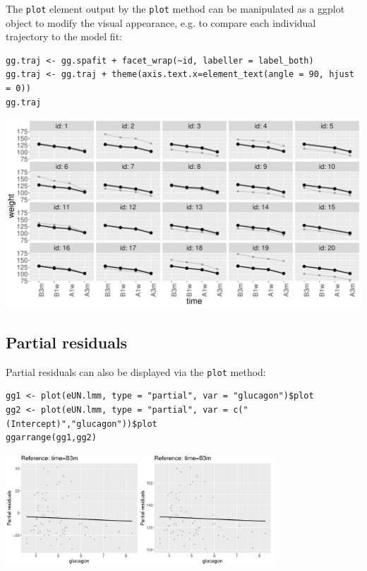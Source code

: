 \documentclass[12pt]{article}
\begin{document}
The \texttt{plot} element output by the \texttt{plot} method can be manipulated as a ggplot object
to modify the visual appearance, e.g. to compare each individual
trajectory to the model fit:
\lstset{language=r,label= ,caption= ,captionpos=b,numbers=none}
\begin{lstlisting}
gg.traj <- gg.spafit + facet_wrap(~id, labeller = label_both)
gg.traj <- gg.traj + theme(axis.text.x=element_text(angle = 90, hjust = 0))
gg.traj
\end{lstlisting}

\begin{center}
\includegraphics[width=\textwidth]{./figures/fit-autoplot-indiv.pdf}
\end{center}

\clearpage

\subsection{Partial residuals}
\label{sec:orge150da1}

Partial residuals can also be displayed via the \texttt{plot} method:
\lstset{language=r,label= ,caption= ,captionpos=b,numbers=none}
\begin{lstlisting}
gg1 <- plot(eUN.lmm, type = "partial", var = "glucagon")$plot
gg2 <- plot(eUN.lmm, type = "partial", var = c("(Intercept)","glucagon"))$plot
ggarrange(gg1,gg2)
\end{lstlisting}

\begin{center}
\includegraphics[width=0.75\textwidth]{./figures/fit-pres.pdf}
\end{center}
\end{document}
